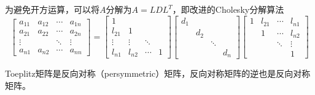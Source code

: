 \documentclass[UTF8]{article}
\begin{document}
\begin{flushleft}
为避免开方运算，可以将$A$分解为$A=LDL^T$，即改进的\textcolor[rgb]{0.00,0.07,1.00}{Cholesky分解算法}
$$
\begin{bmatrix}
a_{11} & a_{12} & \cdots & a_{1n} \\
a_{21} & a_{22} & \cdots & a_{2n} \\
\vdots &        & \ddots & \vdots \\
a_{n1} & a_{n2} & \cdots & a_{nn}
\end{bmatrix}
=
\begin{bmatrix}
1 & & &  \\
l_{21} & 1 & & \\
\vdots & \vdots & \ddots & \\
l_{n1} & l_{n2} & \cdots & 1
\end{bmatrix}
\begin{bmatrix}
d_1 &  &  &   \\
 & d_2 &  &   \\
 &  & \ddots &   \\
 &  &  & d_n
\end{bmatrix}
\begin{bmatrix}
1 & l_{21} & \cdots & l_{n1} \\
 & 1 & \cdots & l_{n2} \\
 &  & \ddots & \vdots \\
 &  &  & 1
\end{bmatrix}
$$

Toeplitz矩阵是反向对称（persymmetric）矩阵，反向对称矩阵的逆也是反向对称矩阵。
\end{flushleft}
\end{document}
